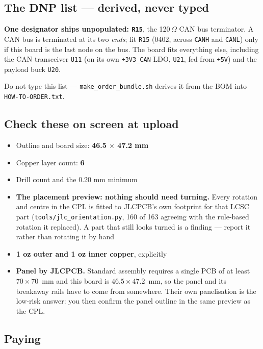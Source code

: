 \documentclass[11pt,a4paper]{article}
\newcommand{\file}[1]{\texttt{\small #1}}
\begin{document}
\subsection{The DNP list --- derived, never typed}

\textbf{One designator ships unpopulated: \file{R15}}, the 120\,$\Omega$ CAN bus terminator.
A CAN bus is terminated at its two \emph{ends}; fit \file{R15} (0402, across \file{CANH}
and \file{CANL}) only if this board is the last node on the bus. The board fits everything
else, including the CAN transceiver \file{U11} (on its own \file{+3V3\_CAN} LDO, \file{U21},
fed from \file{+5V}) and the payload buck \file{U20}.

Do not type this list --- \file{make\_order\_bundle.sh} derives it from the BOM into
\file{HOW-TO-ORDER.txt}.

\subsection{Check these on screen at upload}
\label{sec:upload}

\begin{itemize}
\item Outline and board size: \textbf{46.5 $\times$ 47.2 mm}
\item Copper layer count: \textbf{6}
\item Drill count and the 0.20 mm minimum
\item \textbf{The placement preview: nothing should need turning.} Every rotation and centre
in the CPL is fitted to JLCPCB's own footprint for that LCSC part
(\file{tools/jlc\_orientation.py}, 160 of 163 agreeing with the rule-based rotation it
replaced). A part that still looks turned is a finding --- report it rather than rotating
it by hand
\item \textbf{1 oz outer and 1 oz inner copper}, explicitly
\item \textbf{Panel by JLCPCB.} Standard assembly requires a single PCB of at least
$70 \times 70$~mm and this board is $46.5 \times 47.2$~mm, so the panel and its breakaway
rails have to come from somewhere. Their own panelisation is the low-risk answer: you then
confirm the panel outline in the same preview as the CPL.
\end{itemize}

\subsection{Paying}
\end{document}
